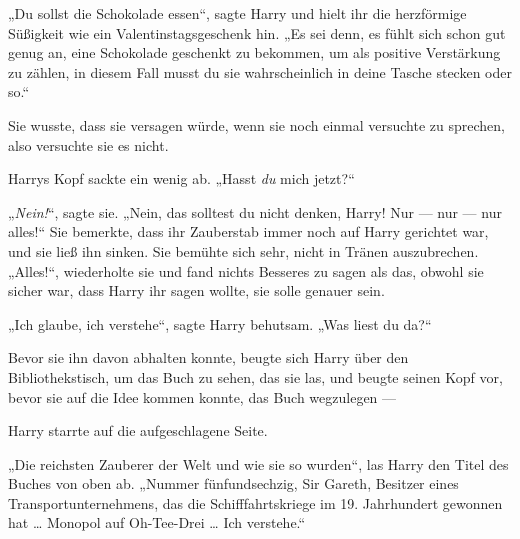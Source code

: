 „Du sollst die Schokolade essen“, sagte Harry und hielt ihr die herzförmige Süßigkeit wie ein Valentinstagsgeschenk hin.
„Es sei denn, es fühlt sich schon gut genug an, eine Schokolade geschenkt zu bekommen, um als positive Verstärkung zu zählen, in diesem Fall musst du sie wahrscheinlich in deine Tasche stecken oder so.“

Sie wusste, dass sie versagen würde, wenn sie noch einmal versuchte zu sprechen, also versuchte sie es nicht.

Harrys Kopf sackte ein wenig ab.
„Hasst \emph{du} mich jetzt?“

„\emph{Nein!}“, sagte sie.
„Nein, das solltest du nicht denken, Harry! Nur — nur — nur alles!“ Sie bemerkte, dass ihr Zauberstab immer noch auf Harry gerichtet war, und sie ließ ihn sinken. Sie bemühte sich sehr, nicht in Tränen auszubrechen.
„Alles!“, wiederholte sie und fand nichts Besseres zu sagen als das, obwohl sie sicher war, dass Harry ihr sagen wollte, sie solle genauer sein.

„Ich glaube, ich verstehe“, sagte Harry behutsam.
„Was liest du da?“

Bevor sie ihn davon abhalten konnte, beugte sich Harry über den Bibliothekstisch, um das Buch zu sehen, das sie las, und beugte seinen Kopf vor, bevor sie auf die Idee kommen konnte, das Buch wegzulegen —

Harry starrte auf die aufgeschlagene Seite.

„Die reichsten Zauberer der Welt und wie sie so wurden“, las Harry den Titel des Buches von oben ab.
„Nummer fünfundsechzig, Sir Gareth, Besitzer eines Transportunternehmens, das die Schifffahrtskriege im 19. Jahrhundert gewonnen hat … Monopol auf Oh-Tee-Drei … Ich verstehe.“

